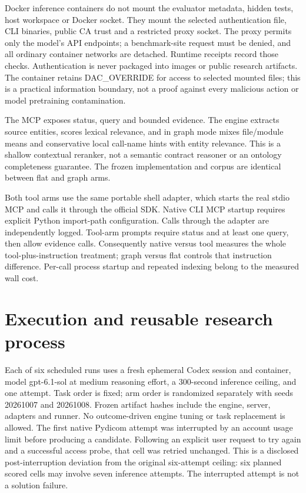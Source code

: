 \documentclass[11pt]{article}
\begin{document}
Docker inference containers do not mount the evaluator metadata, hidden tests, host workspace or Docker socket. They mount the selected authentication file, CLI binaries, public CA trust and a restricted proxy socket. The proxy permits only the model's API endpoints; a benchmark-site request must be denied, and all ordinary container networks are detached. Runtime receipts record those checks. Authentication is never packaged into images or public research artifacts. The container retains DAC\_OVERRIDE for access to selected mounted files; this is a practical information boundary, not a proof against every malicious action or model pretraining contamination.

The MCP exposes status, query and bounded evidence. The engine extracts source entities, scores lexical relevance, and in graph mode mixes file/module means and conservative local call-name hints with entity relevance. This is a shallow contextual reranker, not a semantic contract reasoner or an ontology completeness guarantee. The frozen implementation and corpus are identical between flat and graph arms.

Both tool arms use the same portable shell adapter, which starts the real stdio MCP and calls it through the official SDK. Native CLI MCP startup requires explicit Python import-path configuration. Calls through the adapter are independently logged. Tool-arm prompts require status and at least one query, then allow evidence calls. Consequently native versus tool measures the whole tool-plus-instruction treatment; graph versus flat controls that instruction difference. Per-call process startup and repeated indexing belong to the measured wall cost.

\section{Execution and reusable research process}
Each of six scheduled runs uses a fresh ephemeral Codex session and container, model gpt-6.1-sol at medium reasoning effort, a 300-second inference ceiling, and one attempt. Task order is fixed; arm order is randomized separately with seeds 20261007 and 20261008. Frozen artifact hashes include the engine, server, adapters and runner. No outcome-driven engine tuning or task replacement is allowed. The first native Pydicom attempt was interrupted by an account usage limit before producing a candidate. Following an explicit user request to try again and a successful access probe, that cell was retried unchanged. This is a disclosed post-interruption deviation from the original six-attempt ceiling: six planned scored cells may involve seven inference attempts. The interrupted attempt is not a solution failure.
\end{document}
